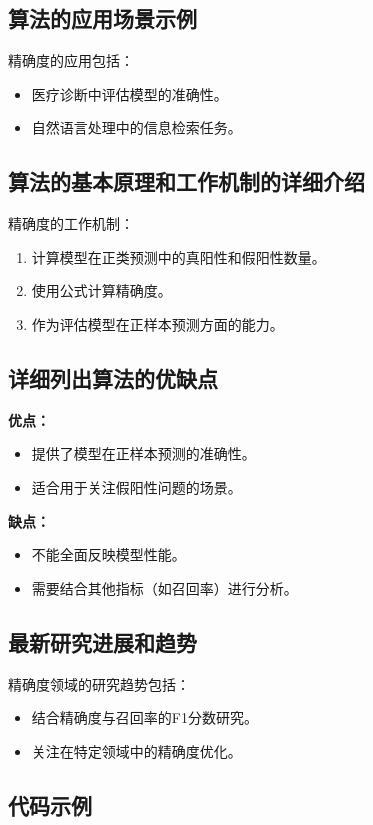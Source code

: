 \subsection*{算法的应用场景示例}
精确度的应用包括：
\begin{itemize}
    \item 医疗诊断中评估模型的准确性。
    \item 自然语言处理中的信息检索任务。
\end{itemize}

\subsection*{算法的基本原理和工作机制的详细介绍}
精确度的工作机制：
\begin{enumerate}
    \item 计算模型在正类预测中的真阳性和假阳性数量。
    \item 使用公式计算精确度。
    \item 作为评估模型在正样本预测方面的能力。
\end{enumerate}

\subsection*{详细列出算法的优缺点}
\textbf{优点：}
\begin{itemize}
    \item 提供了模型在正样本预测的准确性。
    \item 适合用于关注假阳性问题的场景。
\end{itemize}

\textbf{缺点：}
\begin{itemize}
    \item 不能全面反映模型性能。
    \item 需要结合其他指标（如召回率）进行分析。
\end{itemize}

\subsection*{最新研究进展和趋势}
精确度领域的研究趋势包括：
\begin{itemize}
    \item 结合精确度与召回率的F1分数研究。
    \item 关注在特定领域中的精确度优化。
\end{itemize}
\subsection*{代码示例}
\begin{lstlisting}

\end{lstlisting}


